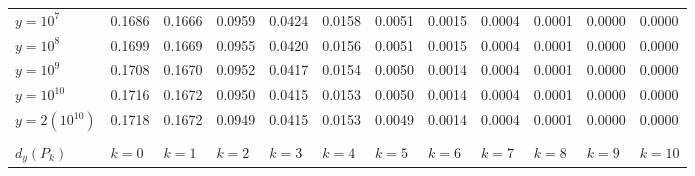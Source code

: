 \documentclass{article}
\theoremstyle{definition}
\begin{document}
\begin{table}[h!]
{\begin{tabular}{l | lllllllllll}
            $y = 10^{7}$            & 0.1686                      & 0.1666                      & 0.0959                      & 0.0424                      & 0.0158                      & 0.0051                      & 0.0015                      & 0.0004                      & 0.0001                      & 0.0000                      & 0.0000                       \\
            $y = 10^{8}$            & 0.1699                      & 0.1669                      & 0.0955                      & 0.0420                      & 0.0156                      & 0.0051                      & 0.0015                      & 0.0004                      & 0.0001                      & 0.0000                      & 0.0000                       \\
            $y = 10^{9}$            & 0.1708                      & 0.1670                      & 0.0952                      & 0.0417                      & 0.0154                      & 0.0050                      & 0.0014                      & 0.0004                      & 0.0001                      & 0.0000                      & 0.0000                       \\
            $y = 10^{10}$           & 0.1716                      & 0.1672                      & 0.0950                      & 0.0415                      & 0.0153                      & 0.0050                      & 0.0014                      & 0.0004                      & 0.0001                      & 0.0000                      & 0.0000                       \\
            $y = 2(10^{10})$        & 0.1718                      & 0.1672                      & 0.0949                      & 0.0415                      & 0.0153                      & 0.0049                      & 0.0014                      & 0.0004                      & 0.0001                      & 0.0000                      & 0.0000                       \\
                                    & \multicolumn{1}{l}{}        & \multicolumn{1}{l}{}        & \multicolumn{1}{l}{}        & \multicolumn{1}{l}{}        & \multicolumn{1}{l}{}        & \multicolumn{1}{l}{}        & \multicolumn{1}{l}{}        & \multicolumn{1}{l}{}        & \multicolumn{1}{l}{}        & \multicolumn{1}{l}{}        & \multicolumn{1}{l}{}         \\
            $d_y(P_k)$              & \multicolumn{1}{l}{$k = 0$} & \multicolumn{1}{l}{$k = 1$} & \multicolumn{1}{l}{$k = 2$} & \multicolumn{1}{l}{$k = 3$} & \multicolumn{1}{l}{$k = 4$} & \multicolumn{1}{l}{$k = 5$} & \multicolumn{1}{l}{$k = 6$} & \multicolumn{1}{l}{$k = 7$} & \multicolumn{1}{l}{$k = 8$} & \multicolumn{1}{l}{$k = 9$} & \multicolumn{1}{l}{$k = 10$} \\


\end{tabular}}
\end{table}
\end{document}
